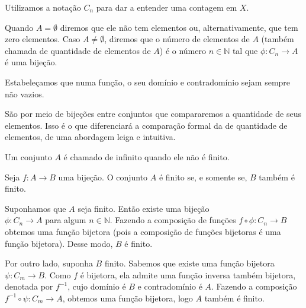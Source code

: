 \documentclass[../main.tex]{subfiles}
\begin{document}
Utilizamos a notação $C_n$ para dar a entender uma contagem em $X$.

Quando $A = \emptyset$ diremos que ele não tem elementos ou, alternativamente, que tem zero elementos. Caso $A \neq \emptyset$, diremos que o número de elementos de $A$ (também chamada de quantidade de elementos de $A$) é o número $n \in \mathbb{N}$ tal que $\phi \colon C_n \to A$ é uma bijeção.

Estabeleçamos que numa função, o seu domínio e contradomínio sejam sempre não vazios.

São por meio de bijeções entre conjuntos que compararemos a quantidade de seus elementos. Isso é o que diferenciará a comparação formal da de quantidade de elementos, de uma abordagem leiga e intuitiva.

\begin{defi}\label{enum-def-conjuntoInfinito}
    Um conjunto $A$ é chamado de infinito quando ele não é finito.
\end{defi}
\begin{teo}
    Seja $f \colon A \to B$ uma bijeção. O conjunto $A$ é finito se, e somente se, $B$ também é finito.
\end{teo}
\begin{dem}
    Suponhamos que $A$ seja finito. Então existe uma bijeção \\ 
    $\phi \colon C_n \to A$ para algum $n \in \mathbb{N}$. Fazendo a composição de funções
    $f \circ \phi \colon C_n \to B$ obtemos uma função bijetora (pois a composição de funções bijetoras é uma função bijetora). Desse modo, $B$ é finito.

    Por outro lado, suponha $B$ finito. Sabemos que existe uma função bijetora ${\psi \colon C_m \to B}$. Como $f$ é bijetora, ela admite uma função inversa também bijetora, denotada por $f^{-1}$, cujo domínio é $B$ e contradomínio é $A$. Fazendo a composição $f^{-1} \circ \psi \colon C_m \to A$, obtemos uma função bijetora, logo $A$ também é finito. 
\end{dem}
\end{document}
